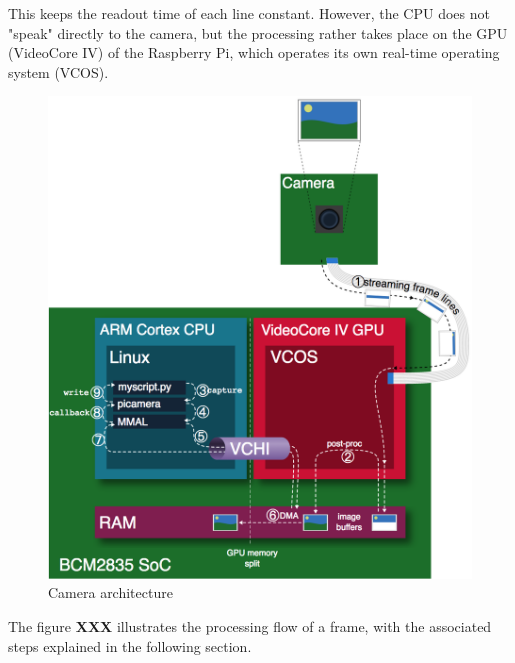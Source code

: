 \documentclass[12pt, a4paper]{report}
\begin{document}
    This keeps the readout time of each line constant. However, the CPU does not "speak" directly to the camera, but the processing rather takes place on the GPU (VideoCore IV) of the Raspberry Pi, which operates its own real-time operating system (VCOS).
    
    \bigskip
    \noindent
    \begin{figure}[H]
    \centering
    \includegraphics[scale=0.7]{Images/camera_architecture.png}
    
    \caption{Camera architecture \cite{ReadTheDocsPicamera}}
    \end{figure}
    
    
    
    \bigskip
    
    The figure \textbf{XXX} illustrates the processing flow of a frame, with the associated steps explained in the following section.
    
\end{document}
